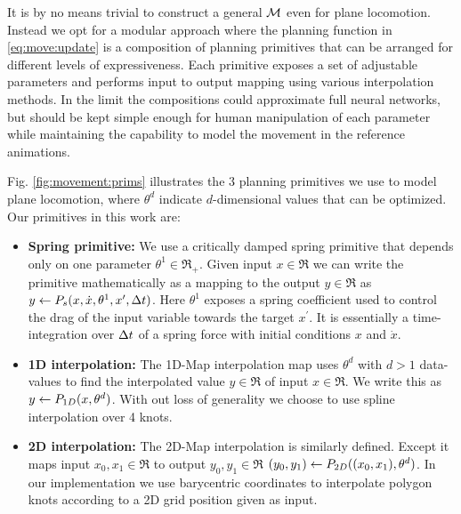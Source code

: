 It is by no means trivial to construct a general $\mathcal{M}$ even for plane locomotion. Instead we opt for a modular approach where the planning function in \eqref{eq:move:update} is a composition of planning primitives that can be arranged for different levels of expressiveness. Each primitive exposes a set of adjustable parameters and performs input to output mapping using various interpolation methods. In the limit the compositions could approximate full neural networks, but should be kept simple enough for human manipulation of each parameter while maintaining the capability to model the movement in the reference animations.     

Fig. \ref{fig:movement:prims} illustrates the 3 planning primitives we use to model plane locomotion, where $\theta^d$ indicate $d$-dimensional values that can be optimized. Our primitives in this work are:

\begin{itemize}
\item{\bf Spring primitive:} We use a critically damped spring primitive that depends only on one parameter $\theta^1 \in \Re_+$. Given input $x \in \Re$ we can write the primitive mathematically as a mapping to the output $y \in \Re$ as $y \leftarrow P_s{( x , \dot{x}, \theta^1, x^\prime, \Delta{t})}$. Here $\theta^1$ exposes a spring coefficient used to control the drag of the input variable towards the target $x^\prime$. It is essentially a time-integration over $\Delta{t}$ of a spring force with initial conditions $x$ and $\dot{x}$.

\item{\bf 1D interpolation:} The 1D-Map interpolation map uses $\theta^d$ with $d>1$ data-values to find the interpolated value $y \in \Re$ of input $x \in \Re$. We write this as  $y \leftarrow P_{1D}(x,\theta^{d})$. With out loss of generality we choose to use spline interpolation over 4 knots.

\item{\bf 2D interpolation:} The 2D-Map interpolation is similarly defined. Except it maps input $x_0,x_1 \in \Re$ to output $y_0,y_1 \in \Re$ $(y_0,y_1) \leftarrow P_{2D}( (x_0, x_1),\theta^{d})$. In our implementation we use barycentric coordinates to interpolate polygon knots according to a 2D grid position given as input.    
\end{itemize}

